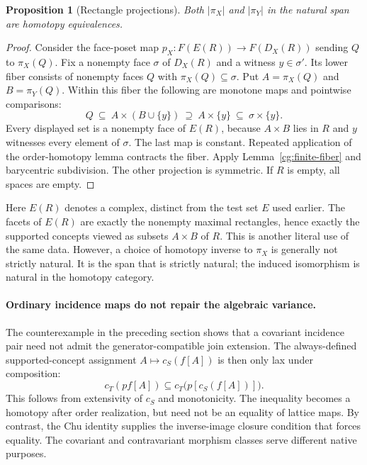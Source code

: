 \documentclass[11pt]{article}
\newtheorem{proposition}[theorem]{Proposition}
\theoremstyle{remark}
\begin{document}
\begin{proposition}[Rectangle projections]\label{cg:rectangle}
Both $|\pi_X|$ and $|\pi_Y|$ in the natural span are homotopy equivalences.
\end{proposition}
\begin{proof}
Consider the face-poset map $p_X:F(E(R))\to F(D_X(R))$ sending $Q$ to
$\pi_X(Q)$. Fix a nonempty face $\sigma$ of $D_X(R)$ and a witness
$y\in\sigma'$. Its lower fiber consists of nonempty faces $Q$ with
$\pi_X(Q)\subseteq\sigma$. Put $A=\pi_X(Q)$ and $B=\pi_Y(Q)$.
Within this fiber the following are monotone maps and pointwise comparisons:
\[
 Q\ \subseteq\ A\times(B\cup\{y\})
 \ \supseteq\ A\times\{y\}
 \ \subseteq\ \sigma\times\{y\}.
\]
Every displayed set is a nonempty face of $E(R)$, because $A\times B$
lies in $R$ and $y$ witnesses every element of $\sigma$. The last map is
constant. Repeated application of the order-homotopy lemma contracts the
fiber. Apply Lemma~\ref{cg:finite-fiber} and barycentric subdivision.
The other projection is symmetric. If $R$ is empty, all spaces are empty.
\end{proof}

Here $E(R)$ denotes a complex, distinct from the test set $E$ used earlier.
The facets of $E(R)$ are exactly the nonempty maximal rectangles, hence
exactly the supported concepts viewed as subsets $A\times B$ of $R$.
This is another literal use of the same data. However, a choice of homotopy
inverse to $\pi_X$ is generally not strictly natural. It is the span that
is strictly natural; the induced isomorphism is natural in the homotopy
category.


\paragraph{Ordinary incidence maps do not repair the algebraic variance.}
The counterexample in the preceding section shows that a covariant
incidence pair need not admit the generator-compatible join extension.
The always-defined supported-concept assignment
$A\mapsto c_S(f[A])$ is then only lax under composition:
\[
 c_T(pf[A])\subseteq c_T\bigl(p[c_S(f[A])]\bigr).
\]
This follows from extensivity of $c_S$ and monotonicity. The inequality
becomes a homotopy after order realization, but need not be an equality
of lattice maps. By contrast, the Chu identity supplies the inverse-image
closure condition that forces equality. The covariant and contravariant
morphism classes serve different native purposes.
\end{document}
